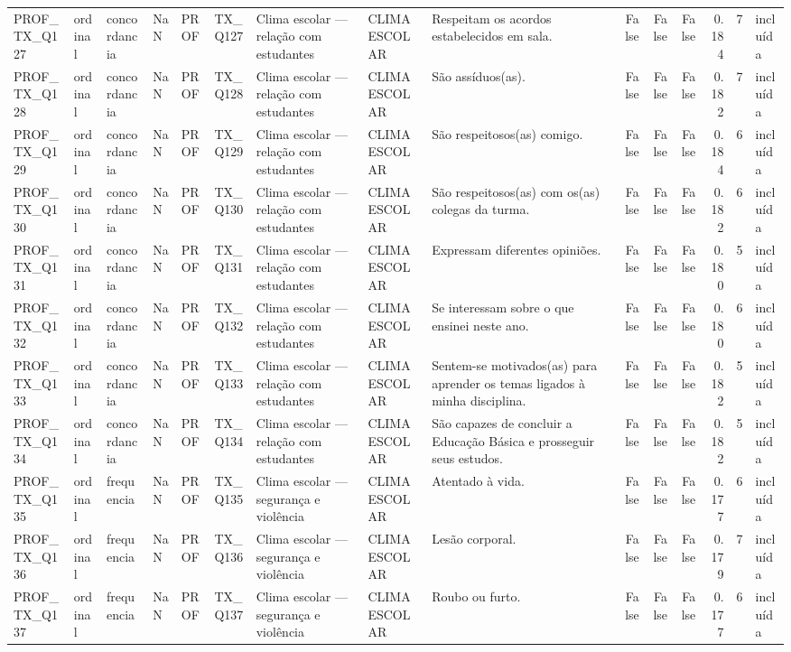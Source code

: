 \begin{tabular}{lllllllllrrrrrl}
PROF\_TX\_Q127 & ordinal & concordancia & NaN & PROF & TX\_Q127 & Clima escolar — relação com estudantes & CLIMA ESCOLAR & Respeitam os acordos estabelecidos em sala. & False & False & False & 0.184 & 7 & incluída \\
PROF\_TX\_Q128 & ordinal & concordancia & NaN & PROF & TX\_Q128 & Clima escolar — relação com estudantes & CLIMA ESCOLAR & São assíduos(as). & False & False & False & 0.182 & 7 & incluída \\
PROF\_TX\_Q129 & ordinal & concordancia & NaN & PROF & TX\_Q129 & Clima escolar — relação com estudantes & CLIMA ESCOLAR & São respeitosos(as) comigo. & False & False & False & 0.184 & 6 & incluída \\
PROF\_TX\_Q130 & ordinal & concordancia & NaN & PROF & TX\_Q130 & Clima escolar — relação com estudantes & CLIMA ESCOLAR & São respeitosos(as) com os(as) colegas da turma. & False & False & False & 0.182 & 6 & incluída \\
PROF\_TX\_Q131 & ordinal & concordancia & NaN & PROF & TX\_Q131 & Clima escolar — relação com estudantes & CLIMA ESCOLAR & Expressam diferentes opiniões. & False & False & False & 0.180 & 5 & incluída \\
PROF\_TX\_Q132 & ordinal & concordancia & NaN & PROF & TX\_Q132 & Clima escolar — relação com estudantes & CLIMA ESCOLAR & Se interessam sobre o que ensinei neste ano. & False & False & False & 0.180 & 6 & incluída \\
PROF\_TX\_Q133 & ordinal & concordancia & NaN & PROF & TX\_Q133 & Clima escolar — relação com estudantes & CLIMA ESCOLAR & Sentem-se motivados(as) para aprender os temas ligados à minha disciplina. & False & False & False & 0.182 & 5 & incluída \\
PROF\_TX\_Q134 & ordinal & concordancia & NaN & PROF & TX\_Q134 & Clima escolar — relação com estudantes & CLIMA ESCOLAR & São capazes de concluir a Educação Básica e prosseguir seus estudos. & False & False & False & 0.182 & 5 & incluída \\
PROF\_TX\_Q135 & ordinal & frequencia & NaN & PROF & TX\_Q135 & Clima escolar — segurança e violência & CLIMA ESCOLAR & Atentado à vida. & False & False & False & 0.177 & 6 & incluída \\
PROF\_TX\_Q136 & ordinal & frequencia & NaN & PROF & TX\_Q136 & Clima escolar — segurança e violência & CLIMA ESCOLAR & Lesão corporal. & False & False & False & 0.179 & 7 & incluída \\
PROF\_TX\_Q137 & ordinal & frequencia & NaN & PROF & TX\_Q137 & Clima escolar — segurança e violência & CLIMA ESCOLAR & Roubo ou furto. & False & False & False & 0.177 & 6 & incluída \\

\end{tabular}

